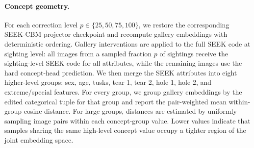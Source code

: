 \paragraph{Concept geometry.}
For each correction level \(p \in \{25,50,75,100\}\), we restore the corresponding SEEK-CBM projector checkpoint and recompute gallery embeddings with deterministic ordering. Gallery interventions are applied to the full SEEK code at sighting level: all images from a sampled fraction \(p\) of sightings receive the sighting-level SEEK code for all attributes, while the remaining images use the hard concept-head prediction. We then merge the SEEK attributes into eight higher-level groups: sex, age, tusks, tear 1, tear 2, hole 1, hole 2, and extreme/special features. For every group, we group gallery embeddings by the edited categorical tuple for that group and report the pair-weighted mean within-group cosine distance. For large groups, distances are estimated by uniformly sampling image pairs within each concept-group value. Lower values indicate that samples sharing the same high-level concept value occupy a tighter region of the joint embedding space.
